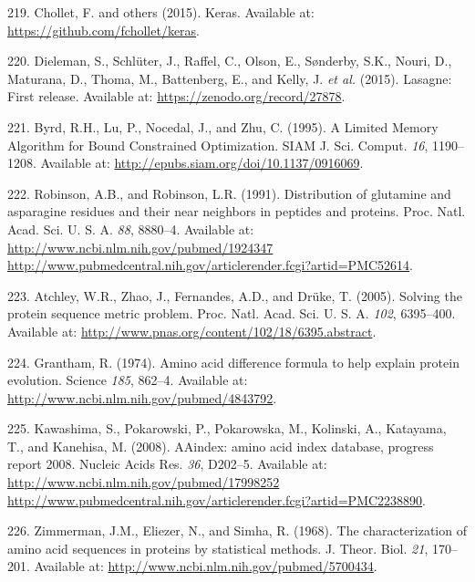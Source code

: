 \documentclass[11pt,a4paper,twoside]{book}
\theoremstyle{definition}
\theoremstyle{definition}
\theoremstyle{remark}
\begin{document}
\hypertarget{ref-Chollet2015}{}
219. Chollet, F. and others (2015). Keras. Available at:
\url{https://github.com/fchollet/keras}.

\hypertarget{ref-Dieleman2015}{}
220. Dieleman, S., Schlüter, J., Raffel, C., Olson, E., Sønderby, S.K.,
Nouri, D., Maturana, D., Thoma, M., Battenberg, E., and Kelly, J.
\emph{et al.} (2015). Lasagne: First release. Available at:
\url{https://zenodo.org/record/27878}.

\hypertarget{ref-Byrd1995}{}
221. Byrd, R.H., Lu, P., Nocedal, J., and Zhu, C. (1995). A Limited
Memory Algorithm for Bound Constrained Optimization. SIAM J. Sci.
Comput. \emph{16}, 1190--1208. Available at:
\url{http://epubs.siam.org/doi/10.1137/0916069}.

\hypertarget{ref-Robinson1991}{}
222. Robinson, A.B., and Robinson, L.R. (1991). Distribution of
glutamine and asparagine residues and their near neighbors in peptides
and proteins. Proc. Natl. Acad. Sci. U. S. A. \emph{88}, 8880--4.
Available at:
\href{http://www.ncbi.nlm.nih.gov/pubmed/1924347\%20http://www.pubmedcentral.nih.gov/articlerender.fcgi?artid=PMC52614}{http://www.ncbi.nlm.nih.gov/pubmed/1924347 http://www.pubmedcentral.nih.gov/articlerender.fcgi?artid=PMC52614}.

\hypertarget{ref-Atchley2005}{}
223. Atchley, W.R., Zhao, J., Fernandes, A.D., and Drüke, T. (2005).
Solving the protein sequence metric problem. Proc. Natl. Acad. Sci. U.
S. A. \emph{102}, 6395--400. Available at:
\url{http://www.pnas.org/content/102/18/6395.abstract}.

\hypertarget{ref-Grantham1974}{}
224. Grantham, R. (1974). Amino acid difference formula to help explain
protein evolution. Science \emph{185}, 862--4. Available at:
\url{http://www.ncbi.nlm.nih.gov/pubmed/4843792}.

\hypertarget{ref-Kawashima2008}{}
225. Kawashima, S., Pokarowski, P., Pokarowska, M., Kolinski, A.,
Katayama, T., and Kanehisa, M. (2008). AAindex: amino acid index
database, progress report 2008. Nucleic Acids Res. \emph{36}, D202--5.
Available at:
\href{http://www.ncbi.nlm.nih.gov/pubmed/17998252\%20http://www.pubmedcentral.nih.gov/articlerender.fcgi?artid=PMC2238890}{http://www.ncbi.nlm.nih.gov/pubmed/17998252 http://www.pubmedcentral.nih.gov/articlerender.fcgi?artid=PMC2238890}.

\hypertarget{ref-Zimmerman1968}{}
226. Zimmerman, J.M., Eliezer, N., and Simha, R. (1968). The
characterization of amino acid sequences in proteins by statistical
methods. J. Theor. Biol. \emph{21}, 170--201. Available at:
\url{http://www.ncbi.nlm.nih.gov/pubmed/5700434}.
\end{document}
